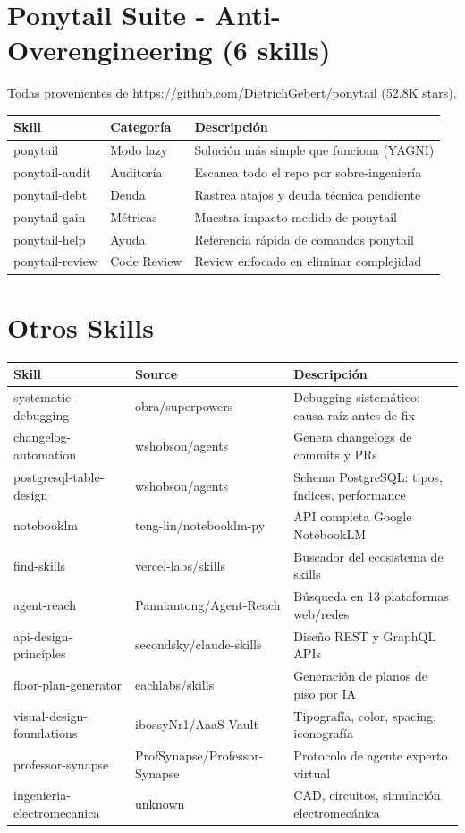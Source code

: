﻿\documentclass[11pt,a4paper]{article}
\begin{document}
\section{Ponytail Suite - Anti-Overengineering (6 skills)}

Todas provenientes de \url{https://github.com/DietrichGebert/ponytail} (52.8K stars).

\begin{longtable}{llp{6cm}}
\toprule
\textbf{Skill} & \textbf{Categoría} & \textbf{Descripción} \\
\midrule
\endhead
ponytail & Modo lazy & Solución más simple que funciona (YAGNI) \\
ponytail-audit & Auditoría & Escanea todo el repo por sobre-ingeniería \\
ponytail-debt & Deuda & Rastrea atajos y deuda técnica pendiente \\
ponytail-gain & Métricas & Muestra impacto medido de ponytail \\
ponytail-help & Ayuda & Referencia rápida de comandos ponytail \\
ponytail-review & Code Review & Review enfocado en eliminar complejidad \\
\bottomrule
\end{longtable}

\section{Otros Skills}

\begin{longtable}{p{3.5cm}p{3cm}p{7cm}}
\toprule
\textbf{Skill} & \textbf{Source} & \textbf{Descripción} \\
\midrule
\endhead
systematic-debugging & obra/superpowers & Debugging sistemático: causa raíz antes de fix \\
changelog-automation & wshobson/agents & Genera changelogs de commits y PRs \\
postgresql-table-design & wshobson/agents & Schema PostgreSQL: tipos, índices, performance \\
notebooklm & teng-lin/notebooklm-py & API completa Google NotebookLM \\
find-skills & vercel-labs/skills & Buscador del ecosistema de skills \\
agent-reach & Panniantong/Agent-Reach & Búsqueda en 13 plataformas web/redes \\
api-design-principles & secondsky/claude-skills & Diseño REST y GraphQL APIs \\
floor-plan-generator & eachlabs/skills & Generación de planos de piso por IA \\
visual-design-foundations & ibossyNr1/AaaS-Vault & Tipografía, color, spacing, iconografía \\
professor-synapse & ProfSynapse/Professor-Synapse & Protocolo de agente experto virtual \\
ingenieria-electromecanica & unknown & CAD, circuitos, simulación electromecánica \\
\bottomrule
\end{longtable}
\end{document}
